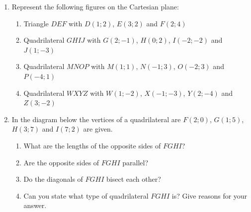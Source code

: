 \begin{eocexercises}{}
\begin{enumerate}[noitemsep, label=\textbf{\arabic*}. ] 
\item 
Represent the following figures on the Cartesian plane: 
 \begin{enumerate}[noitemsep, label=\textbf{(\alph*)} ]
\item Triangle $DEF$ with $D(1;2)$, $E(3;2)$ and $F(2;4)$ 
\item Quadrilateral $GHIJ$ with $G(2;-1)$, $H(0;2)$, $I(-2;-2)$ and $J(1;-3)$
\item Quadrilateral $MNOP$ with $M(1;1)$, $N(-1;3)$, $O(-2;3)$ and $P(-4;1)$ 
\item Quadrilateral $WXYZ$ with $W(1;-2)$, $X(-1;-3)$, $Y(2;-4)$ and $Z(3;-2)$
\end{enumerate}
\item 
In the diagram below the vertices of a quadrilateral are $F(2;0)$, $G(1;5)$, $H(3;7)$ and $I(7;2)$ are given.
\setcounter{subfigure}{0}
\begin{figure}[H] %
\begin{center}
\end{center}
\end{figure}  
 \begin{enumerate}[noitemsep, label=\textbf{(\alph*)} ]
\item 
What are the lengths of the opposite sides of $FGHI$?
\item Are the opposite sides of $FGHI$ parallel?
\item  Do the diagonals of $FGHI$ bisect each other?
\item  Can you state what type of quadrilateral $FGHI$ is? Give reasons for your answer.

\end{enumerate}
\end{enumerate}
\end{eocexercises}
